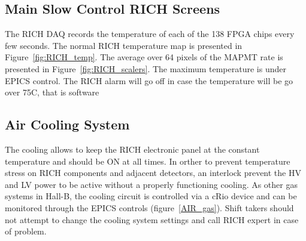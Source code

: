 \documentclass[12pt]{article}
\begin{document}




\subsection{Main Slow Control RICH Screens}
The RICH DAQ records the temperature of each of the 138 FPGA chips every few seconds. The normal RICH temperature map
is presented in Figure~\ref{fig:RICH_temp}. 
The average over 64 pixels of the MAPMT rate is presented in Figure~\ref{fig:RICH_scalers}. The maximum temperature is under EPICS control. The RICH alarm will go off in case the temperature will be go over 75C, that is software 





\subsection{Air Cooling System}
The cooling allows to keep the RICH electronic panel at the constant temperature and should be ON at all times. 
In orther to prevent temperature stress on RICH components and adjacent detectors, an interlock prevent the HV and LV power to be active without 
a properly functioning cooling. As other gas systems in Hall-B, the cooling circuit is controlled via a cRio device  and can be monitored through the EPICS controls (figure~\ref{AIR_gas}).
Shift takers should not attempt to change the cooling system settings and call RICH expert 
in case of problem.  %
\end{document}
